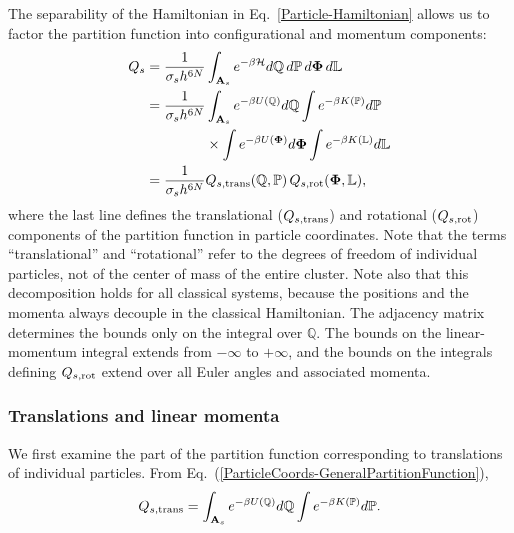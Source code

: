 \documentclass[pre, aps, twocolumn, reprint, amsmath,amssymb, showpacs,
superscriptaddress] {revtex4-1}
\begin{document}
The separability of the Hamiltonian in Eq.~\ref{Particle-Hamiltonian}
allows us to factor the partition function into configurational and
momentum components:
\begin{equation}\label{ParticleCoords-GeneralPartitionFunction}
  \begin{split}
    Q_s = \frac{1}{\sigma_s h^{6N}} &\int_{\mathbf{A}_s}{e^{-\beta \mathcal{H} } }d\mathbb{Q} \, d\mathbb{P} \, d\bm{\Phi} \, d\mathbb{L}\\
    = \frac{1}{\sigma_s h^{6N}} & \int_{\mathbf{A}_s}{e^{- \beta U(\mathbb{Q}) } }d\mathbb{Q}
    \int{e^{- \beta K(\mathbb{P}) } }d\mathbb{P}\\
    &\times\int{e^{- \beta U(\bm{\Phi}) } }d\bm{\Phi}
    \int{e^{- \beta K(\mathbb{L}) } }d\mathbb{L}\\
    = \frac{1}{\sigma_s h^{6N}} &Q_{s, \textnormal{trans}} (\mathbb{Q}, \mathbb{P}) \, Q_{s, \textnormal{rot}}(\bm{\Phi}, \mathbb{L}),
  \end{split}
\end{equation}
where the last line defines the translational ($Q_{s,
  \textnormal{trans}}$) and rotational ($Q_{s, \textnormal{rot}}$)
components of the partition function in particle coordinates. Note that
the terms ``translational'' and ``rotational'' refer to the degrees of
freedom of individual particles, not of the center of mass of the entire
cluster. Note also that this decomposition holds for all classical
systems, because the positions and the momenta always decouple in the
classical Hamiltonian. The adjacency matrix determines the bounds only
on the integral over $\mathbb{Q}$. The bounds on the linear-momentum
integral extends from $-\infty$ to $+\infty$, and the bounds on the
integrals defining $Q_{s, \textnormal{rot}}$ extend over all Euler
angles and associated momenta.

\subsubsection{Translations and linear momenta}

We first examine the part of the partition function corresponding to
translations of individual particles. From
Eq.~(\ref{ParticleCoords-GeneralPartitionFunction}),
\begin{equation}\label{Particle_TranslationalPartitionFunction}
	Q_{s, \textnormal{trans}} = \int_{\mathbf{A}_s}{e^{- \beta U(\mathbb{Q}) } }d\mathbb{Q}
  \int {e^{- \beta K(\mathbb{P}) } }d\mathbb{P}. 
\end{equation}
\end{document}
